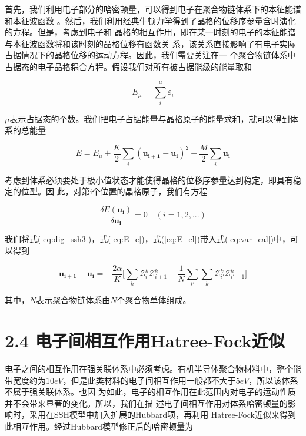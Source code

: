 \documentclass[12pt,]{report}
\begin{document}
首先，我们利用电子部分的哈密顿量，可以得到电子在聚合物链体系下的本征能谱和本征波函数
。然后，我们利用经典牛顿力学得到了晶格的位移序参量含时演化的方程。但是，考虑到电子和
晶格的相互作用，即在某一时刻的电子的本征能谱与本征波函数将和该时刻的晶格位移有函数关
系，该关系直接影响了有电子实际占据情况下的晶格位移的运动方程。因此，我们需要关注在一
个聚合物链体系中占据态的电子晶格耦合方程。假设我们对所有被占据能级的能量取和

\begin{equation} \label{eq:E_e}
E_{\mu} = \sum\limits_i^{\mu} \varepsilon_i
\end{equation}

\noindent
\(\mu\)表示占据态的个数。我们把电子占据能量与晶格原子的能量求和，就可以得到体系的总能量

\begin{equation} \label{eq:E_el}
E = E_{\mu} + \frac{K}{2}\sum\limits_i (\bm{u_{i+1}} - \bm{u_i})^2 + \frac{M}{2}
\sum\limits_i \bm{\dot{u}_i}
\end{equation}

\noindent
考虑到体系必须要处于极小值状态才能使得晶格的位移序参量达到稳定，即具有稳定的位型。因
此，对第i个位置的晶格原子，我们有方程

\begin{equation} \label{eq:var_cal}
\dfrac{\delta E(\bm{u_i})}{\delta \bm{u_i}} = 0 \quad (i = 1, 2, ...)
\end{equation}

\noindent
我们将式(\ref{eq:dig_ssh3})，式(\ref{eq:E_e})，式(\ref{eq:E_el})带入式(\ref{eq:var_cal})中，可以得到

\begin{equation}
\bm{u_{i+1}} - \bm{u_i} = -\dfrac{2 \alpha}{K} \Big[ \sum\limits_k \mathcal{Z}_i^k
\mathcal{Z}_{i+1}^k - \dfrac{1}{N} \sum\limits_{i'}\sum\limits_k \mathcal{Z}_{i'}^k 
\mathcal{Z}_{i'+1}^k\Big]
\end{equation}

\noindent
其中，\(N\)表示聚合物链体系由\(N\)个聚合物单体组成。

\section{2.4
电子间相互作用Hatree-Fock近似}\label{ux7535ux5b50ux95f4ux76f8ux4e92ux4f5cux7528hatree-fockux8fd1ux4f3c}

电子之间的相互作用在强关联体系中必须考虑。有机半导体聚合物材料中，整个能带宽度约为\(10 eV\)，但是此类材料的电子间相互作用一般都不大于\(5eV\)，所以该体系不属于强关联体系。也因
为如此，电子的相互作用在此范围内对电子的运动性质并不会带来显著的变化。所以，我们在描
述电子间相互作用对体系哈密顿量的影响时，采用在SSH模型中加入扩展的Hubbard项，再利用
Hatree-Fock近似来得到此相互作用。经过Hubbard模型修正后的哈密顿量为
\end{document}
